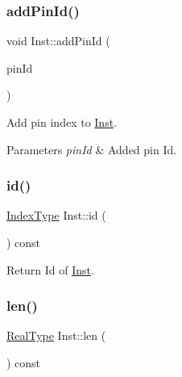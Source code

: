 \subsubsection{\texorpdfstring{add\+Pin\+Id()}{addPinId()}}
{\footnotesize\ttfamily void Inst\+::add\+Pin\+Id (\begin{DoxyParamCaption}\item[{\hyperlink{type_8h_a581e8093e28e7362f2b6937296190676}{Index\+Type}}]{pin\+Id }\end{DoxyParamCaption})\hspace{0.3cm}{\ttfamily [inline]}}



Add pin index to \hyperlink{classInst}{Inst}. 


\begin{DoxyParams}{Parameters}
{\em pin\+Id} & Added pin Id. \\
\hline
\end{DoxyParams}
\mbox{\label{classInst_a42b641ca923af69de223b8911cc2d45f}} 
\subsubsection{\texorpdfstring{id()}{id()}}
{\footnotesize\ttfamily \hyperlink{type_8h_a581e8093e28e7362f2b6937296190676}{Index\+Type} Inst\+::id (\begin{DoxyParamCaption}{ }\end{DoxyParamCaption}) const\hspace{0.3cm}{\ttfamily [inline]}}



Return Id of \hyperlink{classInst}{Inst}. 

\mbox{\label{classInst_ab90470caf2f50b7127ee6946d93d449e}} 
\subsubsection{\texorpdfstring{len()}{len()}}
{\footnotesize\ttfamily \hyperlink{type_8h_a51898ad9e46b1265f3fab67f7d4b04a2}{Real\+Type} Inst\+::len (\begin{DoxyParamCaption}{ }\end{DoxyParamCaption}) const\hspace{0.3cm}{\ttfamily [inline]}}



